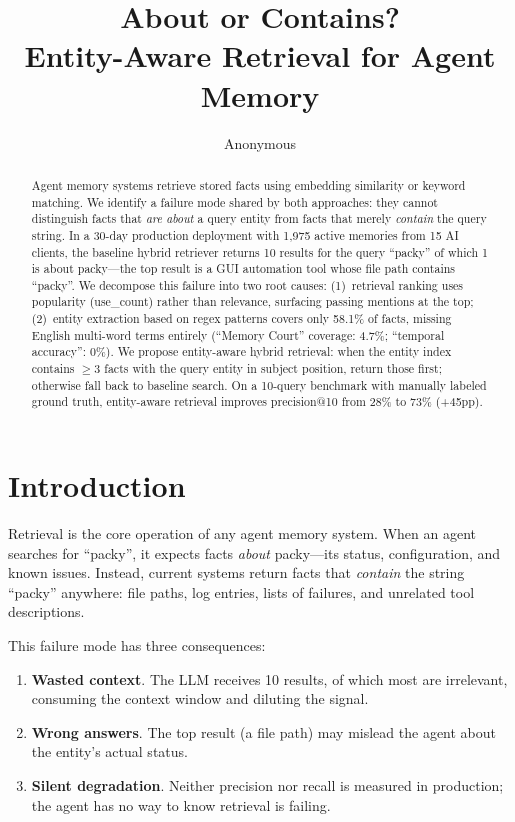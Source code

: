 \documentclass[11pt]{article}
\title{About or Contains?\\ Entity-Aware Retrieval for Agent Memory}
\author{Anonymous}
\begin{document}
\maketitle

\begin{abstract}
Agent memory systems retrieve stored facts using embedding similarity or keyword matching. We identify a failure mode shared by both approaches: they cannot distinguish facts that \emph{are about} a query entity from facts that merely \emph{contain} the query string. In a 30-day production deployment with 1,975 active memories from 15 AI clients, the baseline hybrid retriever returns 10 results for the query ``packy'' of which 1 is about packy---the top result is a GUI automation tool whose file path contains ``packy''. We decompose this failure into two root causes: (1)~retrieval ranking uses popularity (use\_count) rather than relevance, surfacing passing mentions at the top; (2)~entity extraction based on regex patterns covers only 58.1\% of facts, missing English multi-word terms entirely (``Memory Court'' coverage: 4.7\%; ``temporal accuracy'': 0\%). We propose entity-aware hybrid retrieval: when the entity index contains $\geq 3$ facts with the query entity in subject position, return those first; otherwise fall back to baseline search. On a 10-query benchmark with manually labeled ground truth, entity-aware retrieval improves precision@10 from 28\% to 73\% (+45pp).
\end{abstract}

\section{Introduction}

Retrieval is the core operation of any agent memory system. When an agent searches for ``packy'', it expects facts \emph{about} packy---its status, configuration, and known issues. Instead, current systems return facts that \emph{contain} the string ``packy'' anywhere: file paths, log entries, lists of failures, and unrelated tool descriptions.

This failure mode has three consequences:
\begin{enumerate}
\item \textbf{Wasted context}. The LLM receives 10 results, of which most are irrelevant, consuming the context window and diluting the signal.
\item \textbf{Wrong answers}. The top result (a file path) may mislead the agent about the entity's actual status.
\item \textbf{Silent degradation}. Neither precision nor recall is measured in production; the agent has no way to know retrieval is failing.
\end{enumerate}
\end{document}
